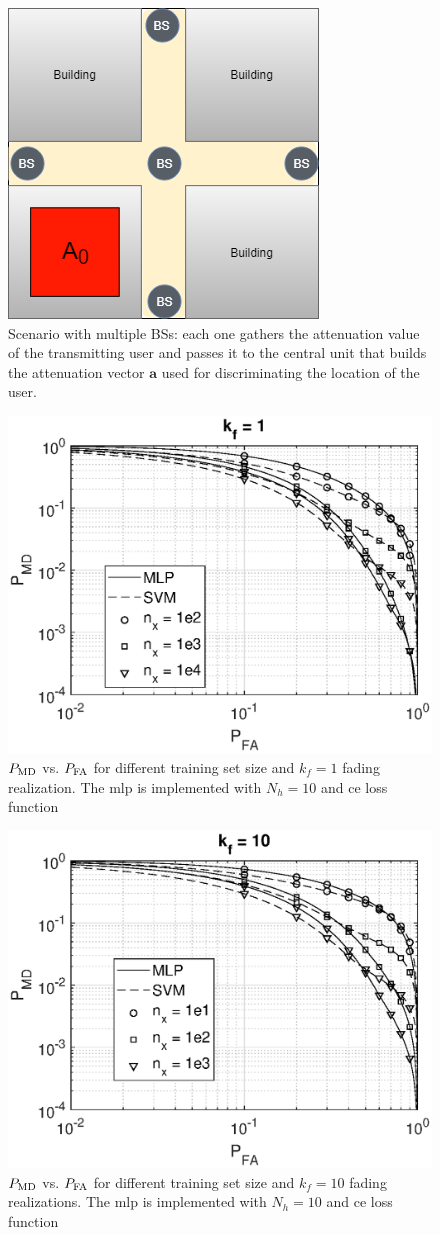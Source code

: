 \documentclass[draftcls,onecolumn,12pt]{IEEEtran}
\begin{document}
\begin{figure}[t]
    \centering
    \includegraphics[width=0.3\columnwidth]{scenario2.png}
    \caption{Scenario with multiple BSs: each one gathers the attenuation value of the transmitting user and passes it to the central unit that builds the attenuation vector $\bm{a}$ used for discriminating the location of the user.}
    \label{fig:mBS}
\end{figure}
\begin{figure}[t]
    \centering
    \includegraphics[width=0.5\columnwidth]{res_avg_nTrain_kf1.eps}
    \caption{$P_{\rm MD}$ vs. $P_{\rm FA}$ for different training set size and $k_f=1$ fading realization. The \ac{mlp} is implemented with $N_h = 10$ and \ac{ce} loss function}
    \label{fig:kf1}
\end{figure}

\begin{figure}[t]
    \centering
    \includegraphics[width=0.5\columnwidth]{res_avg_nTrain_kf10.eps}
    \caption{$P_{\rm MD}$ vs. $P_{\rm FA}$ for different training set size and $k_f=10$ fading realizations. The \ac{mlp} is implemented with $N_h = 10$ and \ac{ce} loss function}
    \label{fig:kf10}
\end{figure}
\end{document}
